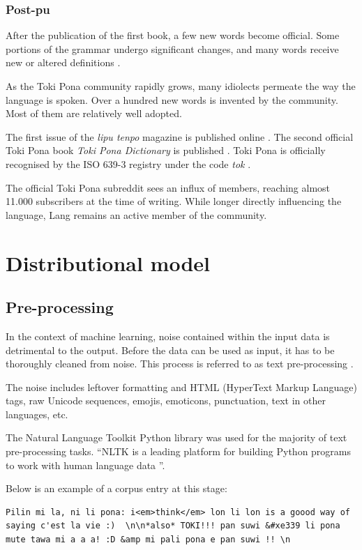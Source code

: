 \documentclass[14pt, a4paper]{extreport}
\begin{document}
      \subsubsection{Post-pu}
After the publication of the first book, a few new words become official. Some portions of the grammar undergo significant changes, and many words receive new or altered definitions \parencite{evo}.

As the Toki Pona community rapidly grows, many idiolects permeate the way the language is spoken. Over a hundred new words is invented by the community. Most of them are relatively well adopted.

The first issue of the \textit{lipu tenpo} magazine is published online \parencite{liputenpo}. The second official Toki Pona book \textit{Toki Pona Dictionary} is published \parencite{ku}. Toki Pona is officially recognised by the ISO 639-3 registry under the code \textit{tok} \parencite{isoproof}.

The official Toki Pona subreddit sees an influx of members, reaching almost 11.000 subscribers at the time of writing. While longer directly influencing the language, Lang remains an active member of the community.

  \section{Distributional model}
    \subsection{Pre-processing}
In the context of machine learning, noise contained within the input data is detrimental to the output. Before the data can be used as input, it has to be thoroughly cleaned from noise. This process is referred to as text pre-processing \parencite[49]{vajjala}.

The noise includes leftover formatting and HTML (HyperText Markup Language) tags, raw Unicode sequences, emojis, emoticons, punctuation, text in other languages, etc.

The Natural Language Toolkit Python library was used for the majority of text pre-processing tasks. ``NLTK is a leading platform for building Python programs to work with human language data \parencite{nltk}''.

Below is an example of a corpus entry at this stage:

\begin{lstlisting}
Pilin mi la, ni li pona: i<em>think</em> lon li lon is a goood way of saying c'est la vie :)  \n\n*also* TOKI!!! pan suwi &#xe339 li pona mute tawa mi a a a! :D &amp mi pali pona e pan suwi !! \n
\end{lstlisting}
\end{document}
